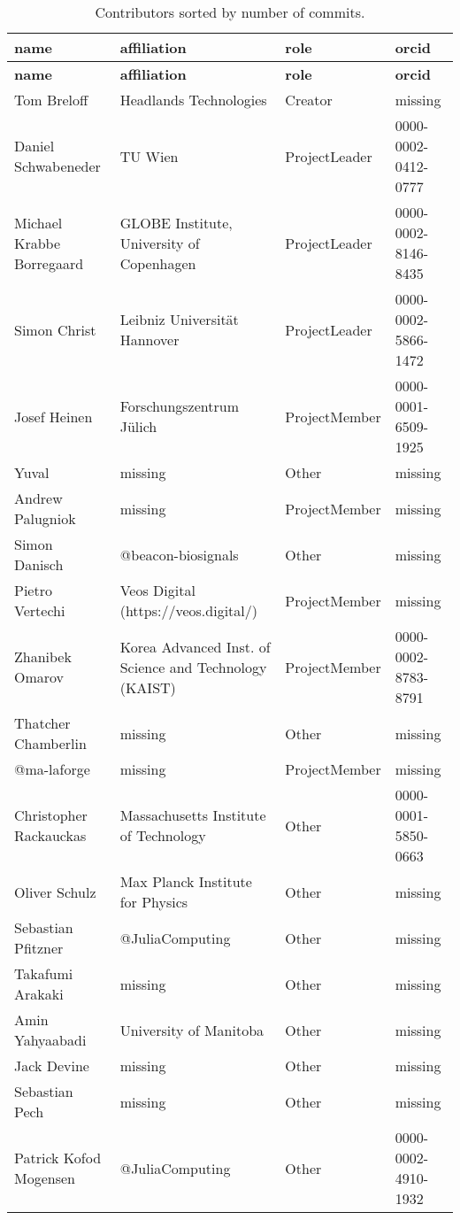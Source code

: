 \begin{longtable}{p{4cm}p{4cm}ll}
    \caption{Contributors sorted by number of commits.}\\
  \hline\hline
  \textbf{name} & \textbf{affiliation} & \textbf{role} & \textbf{orcid} \\\hline
  \endfirsthead
  \hline\hline
  \textbf{name} & \textbf{affiliation} & \textbf{role} & \textbf{orcid} \\\hline
  \endhead
  \hline\hline
  \endfoot
  \endlastfoot
  Tom Breloff & Headlands Technologies & Creator & missing \\
  Daniel Schwabeneder & TU Wien & ProjectLeader & 0000-0002-0412-0777 \\
  Michael Krabbe Borregaard & GLOBE Institute, University of Copenhagen & ProjectLeader & 0000-0002-8146-8435 \\
  Simon Christ & Leibniz Universität Hannover & ProjectLeader & 0000-0002-5866-1472 \\
  Josef Heinen & Forschungszentrum Jülich & ProjectMember & 0000-0001-6509-1925 \\
  Yuval & missing & Other & missing \\
  Andrew Palugniok & missing & ProjectMember & missing \\
  Simon Danisch & @beacon-biosignals & Other & missing \\
  Pietro Vertechi & Veos Digital (https://veos.digital/) & ProjectMember & missing \\
  Zhanibek Omarov & Korea Advanced Inst. of Science and Technology (KAIST) & ProjectMember & 0000-0002-8783-8791 \\
  Thatcher Chamberlin & missing & Other & missing \\
  @ma-laforge & missing & ProjectMember & missing \\
  Christopher Rackauckas & Massachusetts Institute of Technology & Other & 0000-0001-5850-0663 \\
  Oliver Schulz & Max Planck Institute for Physics & Other & missing \\
  Sebastian Pfitzner & @JuliaComputing & Other & missing \\
  Takafumi Arakaki & missing & Other & missing \\
  Amin Yahyaabadi & University of Manitoba & Other & missing \\
  Jack Devine & missing & Other & missing \\
  Sebastian Pech & missing & Other & missing \\
  Patrick Kofod Mogensen & @JuliaComputing & Other & 0000-0002-4910-1932 \\

\end{longtable}
